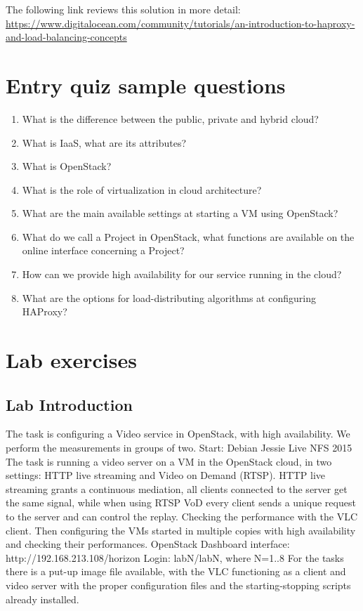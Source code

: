 \documentclass[a4paper]{article}
\begin{document}
The following link reviews this solution in more detail:
\url{https://www.digitalocean.com/community/tutorials/an-introduction-to-haproxy-and-load-balancing-concepts}

\appendix

\section{Entry quiz sample questions}

\begin{enumerate}
    \item What is the difference between the public, private and hybrid cloud?
    \item What is IaaS, what are its attributes?
    \item What is OpenStack?
    \item What is the role of virtualization in cloud architecture?
    \item What are the main available settings at starting a VM using OpenStack?
    \item What do we call a Project in OpenStack, what functions are available on the online interface concerning a
          Project?
    \item How can we provide high availability for our service running in the cloud?
    \item What are the options for load-distributing algorithms at configuring HAProxy?
\end{enumerate}

\section{Lab exercises}

\subsection{Lab Introduction}

The task is configuring a Video service in OpenStack, with high availability. We perform the measurements in groups of
two. Start: Debian Jessie Live NFS 2015
The task is running a video server on a VM in the OpenStack cloud, in two settings: HTTP live streaming
and Video on Demand (RTSP). HTTP live streaming grants a continuous mediation, all clients connected to the server get
the same signal, while when using RTSP VoD every client sends a unique request to the server and can control the
replay.
Checking the performance with the VLC client. Then configuring the VMs started in multiple copies with
high availability and checking their performances.
OpenStack Dashboard interface: http://192.168.213.108/horizon
Login: labN/labN, where N=1..8
For the tasks there is a put-up image file available, with the VLC functioning as a client and video server with the
proper configuration files and the starting-stopping scripts already installed.
\end{document}
